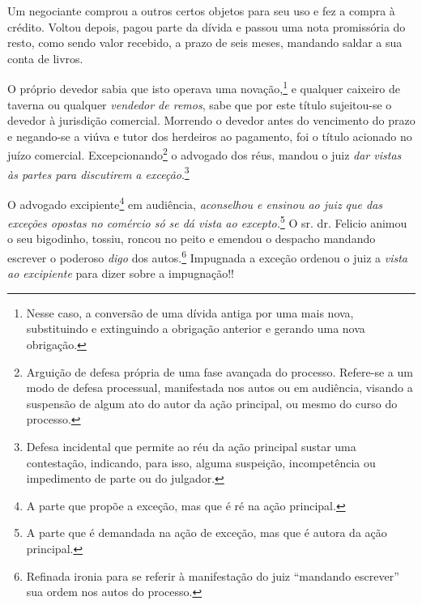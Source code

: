 Um negociante comprou a outros certos objetos para seu uso e fez a
compra à crédito. Voltou depois, pagou parte da dívida e passou uma nota
promissória do resto, como sendo valor recebido, a prazo de seis meses,
mandando saldar a sua conta de livros.

O próprio devedor sabia que isto operava uma novação,\footnote{ Nesse
  caso, a conversão de uma dívida antiga por uma mais nova, substituindo
  e extinguindo a obrigação anterior e gerando uma nova obrigação.} e
qualquer caixeiro de taverna ou qualquer \emph{vendedor de remos}, sabe
que por este título sujeitou-se o devedor à jurisdição comercial.
Morrendo o devedor antes do vencimento do prazo e negando-se a viúva e
tutor dos herdeiros ao pagamento, foi o título acionado no juízo
comercial. Excepcionando\footnote{ Arguição de defesa própria de uma
  fase avançada do processo. Refere-se a um modo de defesa processual,
  manifestada nos autos ou em audiência, visando a suspensão de algum
  ato do autor da ação principal, ou mesmo do curso do processo.} o
advogado dos réus, mandou o juiz \emph{dar vistas às partes para
discutirem a exceção}.\footnote{ Defesa incidental que permite ao réu
  da ação principal sustar uma contestação, indicando, para isso, alguma
  suspeição, incompetência ou impedimento de parte ou do julgador.}

O advogado excipiente\footnote{ A parte que propõe a exceção, mas que é
  ré na ação principal.} em audiência, \emph{aconselhou e ensinou ao
juiz que das exceções opostas no comércio só se dá vista ao
excepto.}\footnote{ A parte que é demandada na ação de exceção, mas que
  é autora da ação principal.} O sr. dr. Felicio animou o seu bigodinho,
tossiu, roncou no peito e emendou o despacho mandando escrever o
poderoso \emph{digo} dos autos.\footnote{ Refinada ironia para se
  referir à manifestação do juiz ``mandando escrever'' sua ordem nos autos
  do processo.} Impugnada a exceção ordenou o juiz a \emph{vista ao
excipiente} para dizer sobre a impugnação!!

